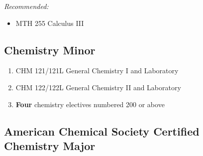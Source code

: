 \documentclass[
  letterpaper,
]{scrbook}
\providecommand{\tightlist}{%
  \setlength{\itemsep}{0pt}\setlength{\parskip}{0pt}}
\begin{document}
\emph{Recommended:}

\begin{itemize}
\tightlist
\item
  MTH 255 Calculus III
\end{itemize}

\subsection{Chemistry Minor}\label{chemistry-minor}

\begin{enumerate}
\def\labelenumi{\arabic{enumi}.}
\item
  CHM 121/121L General Chemistry I and Laboratory
\item
  CHM 122/122L General Chemistry II and Laboratory
\item
  \textbf{Four} chemistry electives numbered 200 or above
\end{enumerate}

\subsection{American Chemical Society Certified Chemistry
Major}\label{american-chemical-society-certified-chemistry-major}
\end{document}
